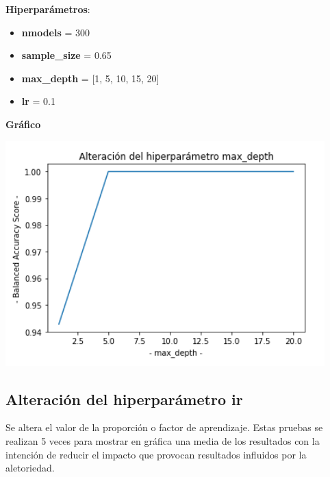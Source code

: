 \documentclass[conference,a4paper]{IEEEtran}
\begin{document}
\begin{textb}
    \textbf{Hiperparámetros}:
  \begin{itemize}
      \item \textbf{nmodels} = 300
      \item \textbf{sample\_size} = 0.65
      \item \textbf{max\_depth} = [1, 5, 10, 15, 20]
      \item \textbf{lr} = 0.1
  \end{itemize}
  \textbf{Gráfico}
  
  \begin{center}
    \includegraphics[scale=0.80]{figures/maxdepth_BreastCancerDataset_trees.png}
    \label{fig:funcion_clasificacion}
  \end{center}
\end{textb}

\subsection{Alteración del hiperparámetro ir}
Se altera el valor de la proporción o factor de aprendizaje. Estas pruebas se realizan 5 veces para mostrar en gráfica una media de los resultados con la intención de reducir el impacto que provocan resultados influidos por la aletoriedad.
\end{document}
